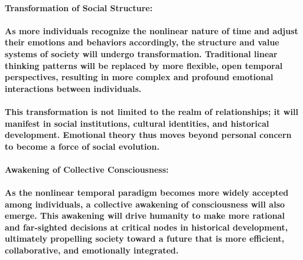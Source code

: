 \documentclass[a4paper]{article}
\begin{document}
\paragraph[Transformation of Social Structure:]{\textbf{Transformation of Social Structure:}}
\paragraph{As more individuals recognize the nonlinear nature of time and adjust their emotions and behaviors
accordingly, the structure and value systems of society will undergo transformation. Traditional linear thinking
patterns will be replaced by more flexible, open temporal perspectives, resulting in more complex and profound
emotional interactions between individuals.}
\paragraph{This transformation is not limited to the realm of relationships; it will manifest in social institutions,
cultural identities, and historical development. Emotional theory thus moves beyond personal concern to become a force
of social evolution.}
\paragraph[Awakening of Collective Consciousness:]{\textbf{Awakening of Collective Consciousness:}}
\paragraph[As the nonlinear temporal paradigm becomes more widely accepted among individuals, a collective awakening of
consciousness will also emerge. This awakening will drive humanity to make more rational and far{}-sighted decisions at
critical nodes in historical development, ultimately propelling society toward a future that is more efficient,
collaborative, and emotionally integrated.]{As the nonlinear temporal paradigm becomes more widely accepted among
individuals, a collective awakening of consciousness will also emerge. This awakening will drive humanity to make more
rational and far-sighted decisions at critical nodes in historical development, ultimately propelling society toward a
future that is more efficient, collaborative, and emotionally integrated.}
\end{document}
